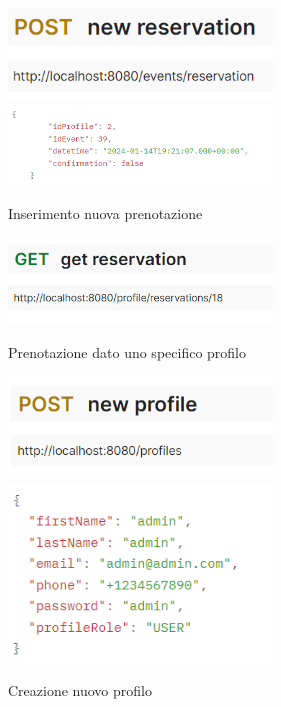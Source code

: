 \begin{figure}[h!]
\includegraphics[width=7cm]{Iterazione 2/test/postman/tnewres.PNG}\\
\includegraphics[width=7cm]{Iterazione 2/test/postman/newres.PNG}\\
\caption{Inserimento nuova prenotazione}
\end{figure}

\begin{figure}[h!]
\includegraphics[width=7cm]{Iterazione 2/test/postman/getreservation.PNG}\\
\caption{Prenotazione dato uno specifico profilo}
\end{figure}

\begin{figure}[h!]
\includegraphics[width=7cm]{Iterazione 2/test/postman/tnewprofile.PNG}\\
\includegraphics[width=7cm]{Iterazione 2/test/postman/newprofile.PNG}\\
\caption{Creazione nuovo profilo}
\end{figure}
